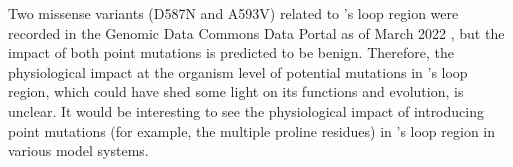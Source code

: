 Two missense variants (D587N and A593V) related to ’s loop region were recorded in the Genomic Data Commons Data Portal as of March 2022 \cite{GDC}, but the impact of both point mutations is predicted to be benign. Therefore, the physiological impact at the organism level of potential mutations in ’s loop region, which could have shed some light on its functions and evolution, is unclear. It would be interesting to see the physiological impact of introducing point mutations (for example, the multiple proline residues) in ’s loop region in various model systems.